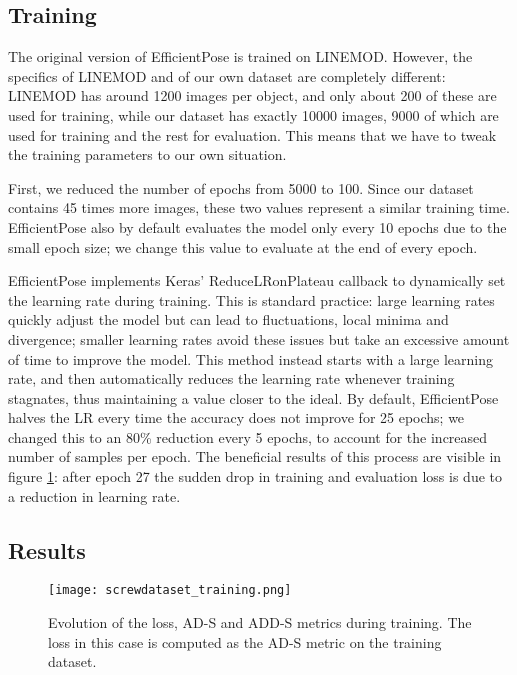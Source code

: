 \subsection{Training}

The original version of EfficientPose is trained on LINEMOD. However, the specifics of LINEMOD and of our own dataset are completely different: LINEMOD has around 1200 images per object, and only about 200 of these are used for training, while our dataset has exactly 10000 images, 9000 of which are used for training and the rest for evaluation. This means that we have to tweak the training parameters to our own situation.

First, we reduced the number of epochs from 5000 to 100. Since our dataset contains 45 times more images, these two values represent a similar training time. EfficientPose also by default evaluates the model only every 10 epochs due to the small epoch size; we change this value to evaluate at the end of every epoch.

EfficientPose implements Keras' ReduceLRonPlateau callback to dynamically set the learning rate during training. This is standard practice: large learning rates quickly adjust the model but can lead to fluctuations, local minima and divergence; smaller learning rates avoid these issues but take an excessive amount of time to improve the model\cite{ReduceLR}. This method instead starts with a large learning rate, and then automatically reduces the learning rate whenever training stagnates, thus maintaining a value closer to the ideal. By default, EfficientPose halves the LR every time the accuracy does not improve for 25 epochs; we changed this to an 80\% reduction every 5 epochs, to account for the increased number of samples per epoch. The beneficial results of this process are visible in figure \ref{fig:screwdataset_training}: after epoch 27 the sudden drop in training and evaluation loss is due to a reduction in learning rate.

\subsection{Results}

\begin{figure}[ht]
    \texttt{[image: screwdataset\_training.png]}
    \caption{Evolution of the loss, AD-S and ADD-S metrics during training. The loss in this case is computed as the AD-S metric on the training dataset.}
    \label{fig:screwdataset_training}
\end{figure}

